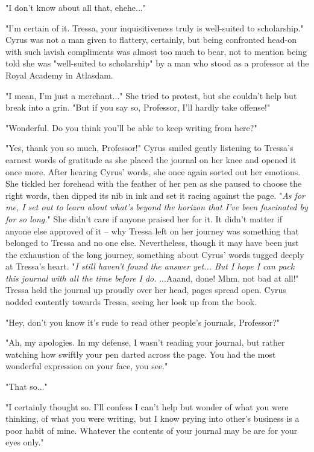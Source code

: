"I don't know about all that, ehehe..."

"I'm certain of it. Tressa, your inquisitiveness truly is well-suited to scholarship." Cyrus was not a man given to flattery, certainly, but being confronted head-on with such lavish compliments was almost too much to bear, not to mention being told she was "well-suited to scholarship" by a man who stood as a professor at the Royal Academy in Atlasdam.

"I mean, I'm just a merchant..." She tried to protest, but she couldn't help but break into a grin. "But if you say so, Professor, I'll hardly take offense!"

"Wonderful. Do you think you'll be able to keep writing from here?"

"Yes, thank you so much, Professor!" Cyrus smiled gently listening to Tressa's earnest words of gratitude as she placed the journal on her knee and opened it once more. After hearing Cyrus' words, she once again sorted out her emotions. She tickled her forehead with the feather of her pen as she paused to choose the right words, then dipped its nib in ink and set it racing against the page. "\emph{As for me, I set out to learn about what's beyond the horizon that I've been fascinated by for so long.}" She didn't care if anyone praised her for it. It didn't matter if anyone else approved of it -- why Tressa left on her journey was something that belonged to Tressa and no one else. Nevertheless, though it may have been just the exhaustion of the long journey, something about Cyrus' words tugged deeply at Tressa's heart. "\emph{I still haven't found the answer yet... But I hope I can pack this journal with all the time before I do.} ...Aaand, done! Mhm, not bad at all!" Tressa held the journal up proudly over her head, pages spread open. Cyrus nodded contently towards Tressa, seeing her look up from the book.

"Hey, don't you know it's rude to read other people's journals, Professor?"

"Ah, my apologies. In my defense, I wasn't reading your journal, but rather watching how swiftly your pen darted across the page. You had the most wonderful expression on your face, you see."

"That so..."

"I certainly thought so. I'll confess I can't help but wonder of what you were thinking, of what you were writing, but I know prying into other's business is a poor habit of mine. Whatever the contents of your journal may be are for your eyes only."

